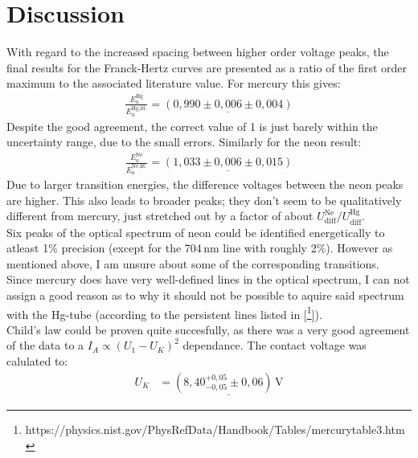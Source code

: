 \documentclass[a4paper,12pt]{article}
\newcommand{\kla}{}
\newcommand{\tecxt}{}
\begin{document}
\section{Discussion}
With regard to the increased spacing between higher order voltage peaks, the final results for the Franck-Hertz curves are presented as a ratio of the first order maximum to the associated literature value. For mercury this gives:
\begin{align*}
\frac{E_a^\tecxt\text{Hg}}{E_a^\tecxt\text{Hg,lit.}}=\underline{\kla\left( {0,990\pm 0,006\pm 0,004} \right)}
\end{align*}
Despite the good agreement, the correct value of 1 is just barely within the uncertainty range, due to the small errors. Similarly for the neon result:
\begin{align*}
\frac{E_a^\tecxt\text{Ne}}{E_a^\tecxt\text{Ne,lit.}}=\underline{\kla\left( {1,033\pm 0,006\pm 0,015} \right)}
\end{align*}
Due to larger transition energies, the difference voltages between the neon peaks are higher. This also leads to broader peaks; they don't seem to be qualitatively different from mercury, just stretched out by a factor of about ${U_\tecxt\text{diff}^\tecxt\text{Ne}}/{U_\tecxt\text{diff}^\tecxt\text{Hg}}$.\\
Six peaks of the optical spectrum of neon could be identified energetically to atleast 1\% precision (except for the 704\,nm line with roughly 2\%). However as mentioned above, I am unsure about some of the corresponding transitions.\\ Since mercury does have very well-defined lines in the optical spectrum, I can not assign a good reason as to why it should not be possible to aquire said spectrum with the Hg-tube (according to the persistent lines listed in [\footnote{https://physics.nist.gov/PhysRefData/Handbook/Tables/mercurytable3.htm}]). \\
Child's law could be proven quite succesfully, as there was a very good agreement of the data to a $I_A\propto (U_1-U_K)^2$ dependance. The contact voltage was calulated to:
\begin{align*}
U_K&=\underline{\kla\left( {8,40_{-0,05}^{+0,05}\pm 0,06} \right)\,\tecxt\text{V}}
\end{align*}
\end{document}
